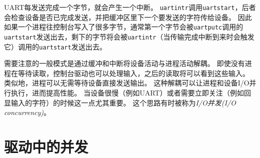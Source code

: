 UART每发送完成一个字节，就会产生一个中断。
\texttt{uartintr}调用\texttt{uartstart}，后者会检查设备是否已完成发送，并把缓冲区里下一个要发送的字符传给设备。
因此如果一个进程往控制台写入了很多字节，通常第一个字节会被\texttt{uartputc}调用的\texttt{uartstart}发送出去，剩下的字节将会被\texttt{uartintr}（当传输完成中断到来时会触发它）调用的\texttt{uartstart}发送出去。

需要注意的一般模式是通过缓冲和中断将设备活动与进程活动解耦。
即使没有进程在等待读取，控制台驱动也可以处理输入，之后的读取将可以看到这些输入。
类似地，进程可以无需等待设备直接发送输出。
这种解耦可以让进程和设备I/O并行执行，进而提高性能。
当设备很慢（例如UART）或者需要立即关注（例如回显输入的字符）的时候这一点尤其重要。
这个思路有时被称为\emph{I/O并发(I/O concurrency)}。

\section{驱动中的并发}
